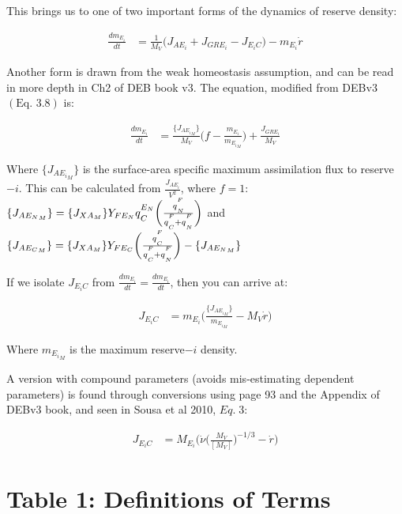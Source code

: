 \documentclass[
]{article}
\begin{document}
This brings us to one of two important forms of the dynamics of reserve
density:

\begin{align}
\frac{d{m_{E_i}}}{dt} &= \frac{1}{M_V}\biggl(J_{AE_{i}} + J_{GR{E_i}} - J_{E_{i}C}\biggr) - m_{E_i}\dot{r}
\end{align}

Another form is drawn from the weak homeostasis assumption, and can be
read in more depth in Ch2 of DEB book v3. The equation, modified from
DEBv3 \((\text{Eq. }3.8)\) is:

\begin{align}
\frac{dm_{E_i}}{dt} &= \frac{\{J_{{A{E_i}}_M}\}}{M_V}\biggl(f - \frac{m_{E_i}}{m_{{E_i}_M}}\biggr) + \frac{J_{GR{E_i}}}{M_V}
\end{align}

Where \(\{J_{{A{E_i}}_M}\}\) is the surface-area specific maximum
assimilation flux to reserve\(-i\). This can be calculated from
\(\frac{J_{A{E_i}}}{V^2}\), where \(f=1\):
\(\{J_{{A{E_N}}_M}\}=\{J_{X{A_M}}\}Y_{F{E_N}}q\strut_{C}^{E_N}\biggl(\frac{q\strut_{N}^{F}}{q\strut_{C}^{F} + q\strut_{N}^{F}}\biggr)\)
and
\(\{J_{{A{E_C}}_M}\}=\{J_{X{A_M}}\}Y_{F{E_C}}\biggl(\frac{q\strut_{C}^{F}}{q\strut_{C}^{F} + q\strut_{N}^{F}}\biggr)-\{J_{{A{E_N}}_M}\}\)

If we isolate \(J_{{E_i}C}\) from
\(\frac{dm_{E_i}}{dt}=\frac{dm_{E_i}}{dt}\), then you can arrive at:

\begin{align}
J_{{E_i}C} &= m_{E_i}\biggl(\frac{\{J_{{A{E_i}}_M}\}}{m_{{E_i}_M}} - {M_V}\dot{r}\biggr)
\end{align}

Where \(m_{{E_i}_M}\) is the maximum reserve\(-i\) density.

A version with compound parameters (avoids mis-estimating dependent
parameters) is found through conversions using page 93 and the Appendix
of DEBv3 book, and seen in Sousa et al 2010, \(Eq.\;3\):

\begin{align}
J_{{E_i}C} &= {M_{E_i}}\biggl(\dot{\nu}\biggl(\frac{M_V}{[M_V]}\biggr)^{-1/3} - \dot{r}\biggr)
\end{align}

\newpage

\section{Table 1: Definitions of
Terms}\label{table-1-definitions-of-terms}
\end{document}
